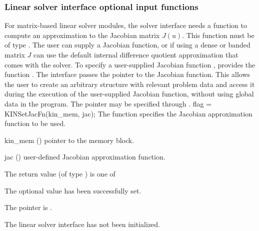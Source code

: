 \subsubsection{Linear solver interface optional input functions}\label{sss:optin_ls}

For matrix-based linear solver modules, the
{\kinls} solver interface needs a function to compute an approximation to
the Jacobian matrix $J(u)$.  This function must be of type .
The user can supply a Jacobian function, or if using a dense or banded
matrix $J$ can use the default internal difference quotient approximation
that comes with the {\kinls} solver.
To specify a user-supplied Jacobian function , {\kinls} provides
the function .
The {\kinls} interface passes the pointer 
to the Jacobian function. This allows the user to
create an arbitrary structure with relevant problem data and access it
during the execution of the user-supplied Jacobian function, without
using global data in the program.  The pointer  may be
specified through .
{
  flag = KINSetJacFn(kin\_mem, jac);
}
{
  The function  specifies the Jacobian
  approximation function to be used.
}
{
  \begin{args}
  \item[kin\_mem] ()
    pointer to the {\kinsol} memory block.
  \item[jac] ()
    user-defined Jacobian approximation function.
  \end{args}
}
{
  The return value  (of type ) is one of
  \begin{args}
  \item[\Id{KINLS\_SUCCESS}]
    The optional value has been successfully set.
  \item[\Id{KINLS\_MEM\_NULL}]
    The  pointer is .
  \item[\Id{KINLS\_LMEM\_NULL}]
    The {\kinls} linear solver interface has not been initialized.
  \end{args}
}
